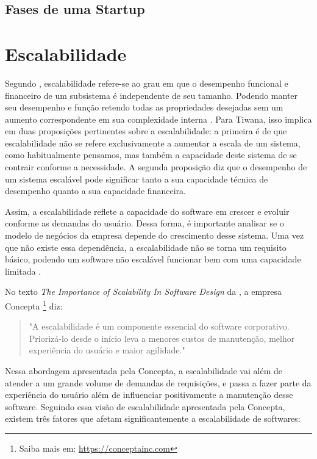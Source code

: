 \subsection{Fases de uma Startup}

\section{Escalabilidade}

Segundo , escalabilidade refere-se ao grau em que
o desempenho funcional e financeiro de um subsistema é independente de seu tamanho.
Podendo manter seu desempenho e função retendo todas as propriedades desejadas sem
um aumento correspondente em sua complexidade interna
. Para Tiwana, isso implica em duas
proposições pertinentes sobre a escalabilidade: a primeira é de que escalabilidade não
se refere exclusivamente a aumentar a escala de um sistema, como habitualmente
pensamos, mas também a capacidade deste sistema de se contrair conforme a necessidade.
A segunda proposição diz que o desempenho de um sistema escalável pode significar
tanto a sua capacidade técnica de desempenho quanto a sua capacidade financeira.

Assim, a escalabilidade reflete a capacidade do software em crescer e evoluir
conforme as demandas do usuário. Dessa forma, é importante analisar se o
modelo de negócios da empresa depende do crescimento desse sistema. Uma vez que
não existe essa dependência, a escalabilidade não se torna um requisito básico,
podendo um software não escalável funcionar bem com uma capacidade limitada
\cite{ConceptaScalability}.

No texto \textit{The Importance of Scalability In Software Design}
da , a empresa Concepta
\footnote{Saiba mais em: \url{https://conceptainc.com}} diz:

  \begin{quotation}
    "A escalabilidade é um componente essencial do software corporativo. Priorizá-lo
    desde o início leva a menores custos de manutenção, melhor experiência do usuário
    e maior agilidade."
  \end{quotation}

Nessa abordagem apresentada pela Concepta, a escalabilidade vai além de atender
a um grande volume de demandas de requisições, e passa a fazer parte da
experiência do usuário além de influenciar positivamente a manutenção desse
software. Seguindo essa visão de escalabilidade apresentada pela Concepta,
existem três fatores que afetam significantemente a escalabilidade de softwares:

